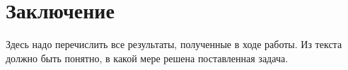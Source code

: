 \section{Заключение}
\label{sec:Chapter6} 

Здесь надо перечислить все результаты, полученные в ходе работы. Из текста
должно быть понятно, в какой мере решена поставленная задача.
